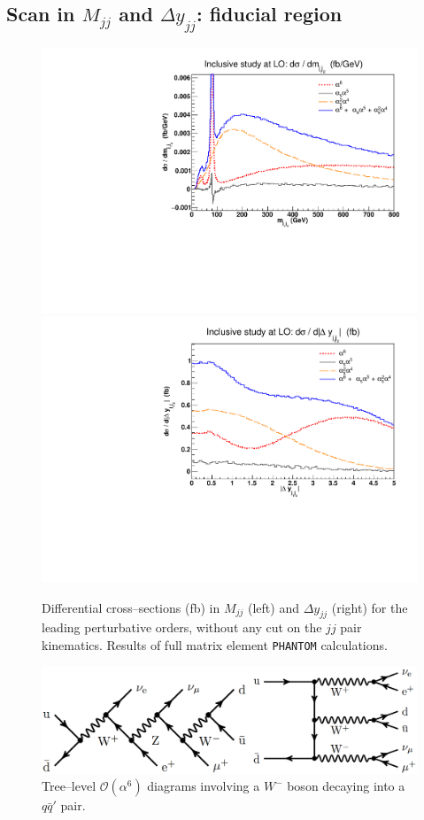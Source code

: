 \subsection{Scan in $M_{jj}$ and $\Delta y_{jj}$: fiducial region}\label{subsec:scan_full}
\begin{figure}[hbt]
\centering
\includegraphics[scale=0.395]{figures/scanfigures/mjj_full.pdf}
\includegraphics[scale=0.395]{figures/scanfigures/dyjj_full.pdf}
\caption{Differential cross--sections (fb) in $M_{jj}$ (left) and $\Delta y_{jj}$ (right) for the leading perturbative orders, without any cut on the $jj$ pair kinematics. Results of full matrix element \texttt{PHANTOM} calculations.} \label{fig:mjjdyjj_1d}
\end{figure}

\begin{figure}[hbt]
\centering %
\includegraphics[scale=0.19]{figures/scanfigures/jjpeak_diag.png}
\caption{Tree--level $\mathcal{O}(\alpha^6)$ diagrams involving a $W^-$ boson decaying into a $q\bar{q}'$ pair.} \label{fig:jjpeak_diag}
\end{figure}


